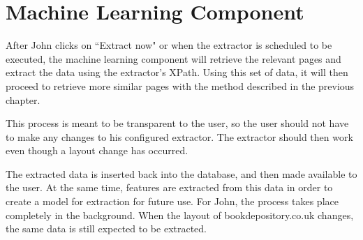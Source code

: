 \section{Machine Learning Component}
After John clicks on ``Extract now" or when the extractor is scheduled to be executed, the
machine learning component will retrieve the relevant pages and extract the data using the
extractor's XPath. Using this set of data, it will then proceed to retrieve more similar pages
with the method described in the previous chapter.

This process is meant to be transparent to the user, so the user should not have to make
any changes to his configured extractor. The extractor should then work even though a layout 
change has occurred.


	The extracted data is inserted back into the database, and then made available to the user.
At the same time, features are extracted from this data in order to create a model for
extraction for future use.  For John, the process takes place completely in the background.
When the layout of bookdepository.co.uk changes, the same data is still expected to be extracted.